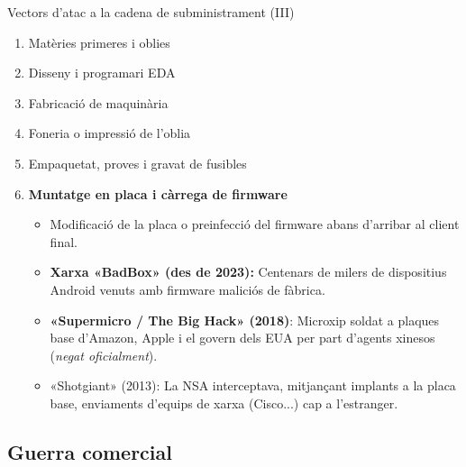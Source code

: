 \documentclass[catalan]{beamer}
\begin{document}
\begin{frame}{Vectors d'atac a la cadena de subministrament (III)}
  \begin{enumerate}
    \item \textcolor{black!35}{Matèries primeres i oblies}
    \item \textcolor{black!35}{Disseny i programari EDA}
    \item \textcolor{black!35}{Fabricació de maquinària}
    \item \textcolor{black!35}{Foneria o impressió de l'oblia}
    \item \textcolor{black!35}{Empaquetat, proves i gravat de fusibles}
    \item \textbf{\textcolor{structure}{Muntatge en placa i càrrega de firmware}}
      \begin{itemize}
        \item Modificació de la placa o preinfecció del firmware abans d'arribar al client final.
        \pause
      \item \textbf{Xarxa «BadBox» (des de 2023):} Centenars de milers de dispositius Android venuts amb firmware maliciós de fàbrica.
      \item \textbf{«Supermicro / The Big Hack» (2018)}: Microxip soldat a plaques base d'Amazon, Apple i el govern dels EUA per part d'agents xinesos (\textit{negat oficialment}).
      \item \textcolor{black!35}{«Shotgiant» (2013): La NSA interceptava, mitjançant implants a la placa base, enviaments d'equips de xarxa (Cisco...) cap a l'estranger.}
      \end{itemize}
  \end{enumerate}
\end{frame}

\subsection{Guerra comercial}
\end{document}
